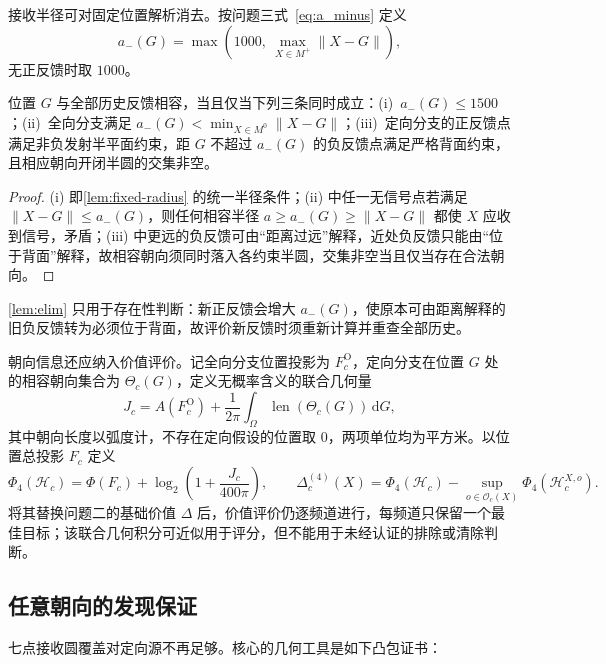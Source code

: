 \documentclass[withoutpreface]{cumcmthesis}
\begin{document}
接收半径可对固定位置解析消去。按问题三式~\eqref{eq:a_minus} 定义
\begin{equation}\label{eq:a_minus_elim}
a_-(G)=\max\left(1000,\ \max_{X\in M^+}\|X-G\|\right),
\end{equation}
无正反馈时取 $1000$。

\begin{lemma}[半径与朝向的解析消去]\label{lem:elim}
位置 $G$ 与全部历史反馈相容，当且仅当下列三条同时成立：(i)~$a_-(G)\le1500$；(ii)~全向分支满足 $a_-(G)<\min_{X\in M^0}\|X-G\|$；(iii)~定向分支的正反馈点满足非负发射半平面约束，距 $G$ 不超过 $a_-(G)$ 的负反馈点满足严格背面约束，且相应朝向开闭半圆的交集非空。
\end{lemma}
\begin{proof}
(i) 即\cref{lem:fixed-radius} 的统一半径条件；(ii) 中任一无信号点若满足 $\|X-G\|\le a_-(G)$，则任何相容半径 $a\ge a_-(G)\ge\|X-G\|$ 都使 $X$ 应收到信号，矛盾；(iii) 中更远的负反馈可由“距离过远”解释，近处负反馈只能由“位于背面”解释，故相容朝向须同时落入各约束半圆，交集非空当且仅当存在合法朝向。
\end{proof}

\cref{lem:elim} 只用于存在性判断：新正反馈会增大 $a_-(G)$，使原本可由距离解释的旧负反馈转为必须位于背面，故评价新反馈时须重新计算并重查全部历史。

朝向信息还应纳入价值评价。记全向分支位置投影为 $F_c^{\mathrm O}$，定向分支在位置 $G$ 处的相容朝向集合为 $\Theta_c(G)$，定义无概率含义的联合几何量
\begin{equation}\label{eq:J_c}
J_c=A(F_c^{\mathrm O})+\frac{1}{2\pi}\int_{\Omega}\operatorname{len}(\Theta_c(G))\,\mathrm dG,
\end{equation}
其中朝向长度以弧度计，不存在定向假设的位置取 $0$，两项单位均为平方米。以位置总投影 $F_c$ 定义
\begin{equation}\label{eq:phi4}
\Phi_4(\mathcal H_c)=\Phi(F_c)+\log_2\!\left(1+\frac{J_c}{400\pi}\right),
\qquad
\Delta_c^{(4)}(X)=\Phi_4(\mathcal H_c)-\sup_{o\in\mathcal O_c(X)}\Phi_4\!\left(\mathcal H_c^{X,o}\right).
\end{equation}
将其替换问题二的基础价值 $\Delta$ 后，价值评价仍逐频道进行，每频道只保留一个最佳目标；该联合几何积分可近似用于评分，但不能用于未经认证的排除或清除判断。

\subsection{任意朝向的发现保证}

七点接收圆覆盖对定向源不再足够。核心的几何工具是如下凸包证书：
\end{document}
